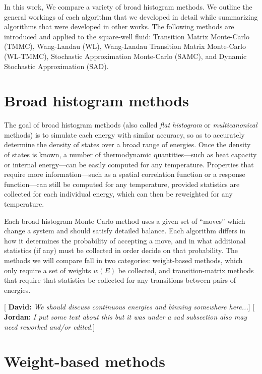 \documentclass[letterpaper,twocolumn,amsmath,amssymb,pre,aps,10pt]{revtex4-1}
\newcommand{\green}[1]{{\bf \color{green} #1}}
\newcommand{\blue}[1]{{\bf \color{blue} #1}}
\newcommand{\davidsays}[1]{{\color{red} [\green{David:} \emph{#1}]}}
\newcommand{\jpsays}[1]{{\color{red} [\blue{Jordan:} \emph{#1}]}}
\begin{document}
In this work, We compare a variety of broad histogram
methods.  We outline the general workings of each algorithm that we
developed in detail while summarizing algorithms that were developed in other
works.  The following methods are introduced and applied to the
square-well fluid: Transition Matrix Monte-Carlo (TMMC), Wang-Landau
(WL), Wang-Landau Transition Matrix Monte-Carlo (WL-TMMC), Stochastic
Approximation Monte-Carlo (SAMC), and Dynamic Stochastic Approximation
(SAD).

\section{Broad histogram methods}\label{sec:histogram}

The goal of broad histogram methods (also called \emph{flat histogram}
or \emph{multicanonical} methods) is to simulate each energy with
similar accuracy, so as to accurately determine the density of states
over a broad range of energies.  Once the density of states is known,
a number of thermodynamic quantities---such as heat capacity or
internal energy---can be easily computed for any temperature.
Properties that require more information---such as a spatial
correlation function or a response function---can still be computed
for any temperature, provided statistics are collected for each
individual energy, which can then be reweighted for any temperature.

Each broad histogram Monte Carlo method uses a given set of ``moves''
which change a system and should satisfy detailed balance.  Each
algorithm differs in how it determines the probability of accepting a
move, and in what additional statistics (if any) must be collected in
order decide on that probability.  The methods we will compare fall in
two categories:  weight-based methods, which only require a set of
weights $w(E)$ be collected, and transition-matrix methods that
require that statistics be collected for any transitions between pairs
of energies.

\davidsays{We should discuss continuous energies and binning somewhere
  here...}
\jpsays{I put some text about this but it was under a sad subsection also
may need reworked and/or edited.}

\section{Weight-based methods}\label{sec:weight}
\end{document}
